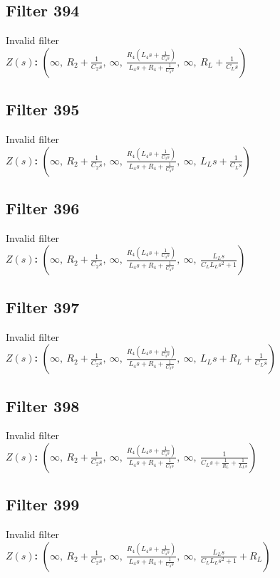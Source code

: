 \documentclass{article}
\begin{document}
\subsection*{Filter 394}
Invalid filter \\ 
\textbf{$Z(s)$:} $\left( \infty, \  R_{2} + \frac{1}{C_{2} s}, \  \infty, \  \frac{R_{4} \left(L_{4} s + \frac{1}{C_{4} s}\right)}{L_{4} s + R_{4} + \frac{1}{C_{4} s}}, \  \infty, \  R_{L} + \frac{1}{C_{L} s}\right)$ \\ 
\subsection*{Filter 395}
Invalid filter \\ 
\textbf{$Z(s)$:} $\left( \infty, \  R_{2} + \frac{1}{C_{2} s}, \  \infty, \  \frac{R_{4} \left(L_{4} s + \frac{1}{C_{4} s}\right)}{L_{4} s + R_{4} + \frac{1}{C_{4} s}}, \  \infty, \  L_{L} s + \frac{1}{C_{L} s}\right)$ \\ 
\subsection*{Filter 396}
Invalid filter \\ 
\textbf{$Z(s)$:} $\left( \infty, \  R_{2} + \frac{1}{C_{2} s}, \  \infty, \  \frac{R_{4} \left(L_{4} s + \frac{1}{C_{4} s}\right)}{L_{4} s + R_{4} + \frac{1}{C_{4} s}}, \  \infty, \  \frac{L_{L} s}{C_{L} L_{L} s^{2} + 1}\right)$ \\ 
\subsection*{Filter 397}
Invalid filter \\ 
\textbf{$Z(s)$:} $\left( \infty, \  R_{2} + \frac{1}{C_{2} s}, \  \infty, \  \frac{R_{4} \left(L_{4} s + \frac{1}{C_{4} s}\right)}{L_{4} s + R_{4} + \frac{1}{C_{4} s}}, \  \infty, \  L_{L} s + R_{L} + \frac{1}{C_{L} s}\right)$ \\ 
\subsection*{Filter 398}
Invalid filter \\ 
\textbf{$Z(s)$:} $\left( \infty, \  R_{2} + \frac{1}{C_{2} s}, \  \infty, \  \frac{R_{4} \left(L_{4} s + \frac{1}{C_{4} s}\right)}{L_{4} s + R_{4} + \frac{1}{C_{4} s}}, \  \infty, \  \frac{1}{C_{L} s + \frac{1}{R_{L}} + \frac{1}{L_{L} s}}\right)$ \\ 
\subsection*{Filter 399}
Invalid filter \\ 
\textbf{$Z(s)$:} $\left( \infty, \  R_{2} + \frac{1}{C_{2} s}, \  \infty, \  \frac{R_{4} \left(L_{4} s + \frac{1}{C_{4} s}\right)}{L_{4} s + R_{4} + \frac{1}{C_{4} s}}, \  \infty, \  \frac{L_{L} s}{C_{L} L_{L} s^{2} + 1} + R_{L}\right)$ \\ 
\end{document}
